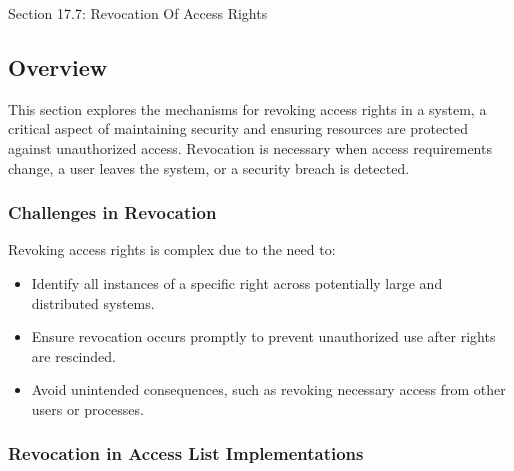 \begin{notes}{Section 17.7: Revocation Of Access Rights}
    \subsection*{Overview}

    This section explores the mechanisms for revoking access rights in a system, a critical aspect of maintaining security and ensuring resources are protected against unauthorized access. Revocation 
    is necessary when access requirements change, a user leaves the system, or a security breach is detected.
    
    \subsubsection*{Challenges in Revocation}
    
    Revoking access rights is complex due to the need to:
    \begin{itemize}
        \item Identify all instances of a specific right across potentially large and distributed systems.
        \item Ensure revocation occurs promptly to prevent unauthorized use after rights are rescinded.
        \item Avoid unintended consequences, such as revoking necessary access from other users or processes.
    \end{itemize}
    
    \subsubsection*{Revocation in Access List Implementations}
    

\end{notes}
